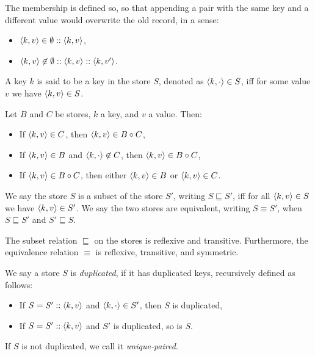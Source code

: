 The membership is defined so, so that appending a pair with the same key and a different value would overwrite the old record, in a sense:
\begin{itemize}
    \item $\langle k, v \rangle \in \emptyset :: \langle k, v \rangle$,
    \item $\langle k, v \rangle \not\in \emptyset :: \langle k, v \rangle :: \left\langle k, v' \right\rangle$.
\end{itemize}

\begin{definition}
A key $k$ is said to be a key in the store $S$, denoted as $\left\langle k, \cdot \right\rangle \in S$, iff for some value $v$ we have $\langle k, v \rangle \in S$.
\end{definition}

\begin{lemma}
Let $B$ and $C$ be stores, $k$ a key, and $v$ a value. Then:
\begin{itemize}
    \item If $\langle k, v \rangle \in C$, then $\langle k, v \rangle \in B \circ C$,
    \item If $\langle k, v \rangle \in B$ and $\left\langle k, \cdot \right\rangle \not\in C$, then $\langle k, v \rangle \in B \circ C$,
    \item If $\langle k, v \rangle \in B \circ C$, then either $\langle k, v \rangle \in B$ or $\langle k, v \rangle \in C$.
\end{itemize}
\end{lemma}

\begin{definition}[Equivalence]
We say the store $S$ is a subset of the store $S'$, writing $S \sqsubseteq S'$, iff for all $\langle k, v \rangle \in S$ we have $\langle k, v \rangle \in S'$. We say the two stores are equivalent, writing $S \equiv S'$, when $S \sqsubseteq S'$ and $S' \sqsubseteq S$.
\end{definition}

\begin{lemma}
The subset relation $\sqsubseteq$ on the stores is reflexive and transitive. Furthermore, the equivalence relation $\equiv$ is reflexive, transitive, and symmetric.
\end{lemma}

\begin{definition}[Normality]
We say a store $S$ is \textit{duplicated}, if it has duplicated keys, recursively defined as follows:
\begin{itemize}
    \item If $S = S' :: \langle k, v \rangle$ and $\left\langle k, \cdot \right\rangle \in S'$, then $S$ is duplicated,
    \item If $S = S' :: \langle k, v \rangle$ and $S'$ is duplicated, so is $S$.
\end{itemize}
If $S$ is not duplicated, we call it \textit{unique-paired}.
\end{definition}

